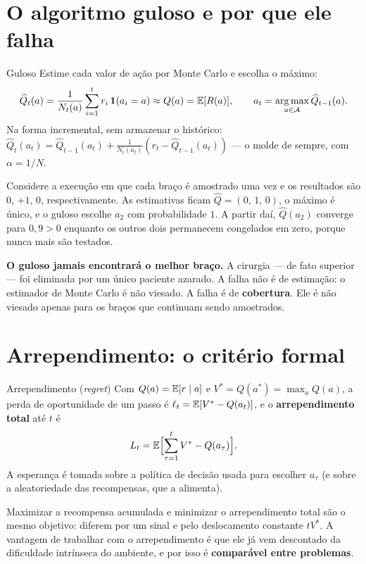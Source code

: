 \documentclass[11pt, a4paper]{article}
\newcommand{\Qhat}{\widehat{Q}}
\newcommand{\Nc}{N}
\newcommand{\one}{\mathbf{1}}
\newcommand{\Reg}{L}
\begin{document}
\section{O algoritmo guloso e por que ele falha}

\begin{algbox}{Guloso}
Estime cada valor de ação por Monte Carlo e escolha o máximo:
\[
  \Qhat_t(a) = \frac{1}{\Nc_t(a)} \sum_{i=1}^{t} r_i\,\one(a_i = a)
  \approx Q(a) = \E[R(a)],
  \qquad
  a_t = \argmax_{a \in \gA} \Qhat_{t-1}(a).
\]
Na forma incremental, sem armazenar o histórico:
$\Qhat_t(a_t) = \Qhat_{t-1}(a_t) + \frac{1}{\Nc_t(a_t)}(r_t - \Qhat_{t-1}(a_t))$
— o molde de sempre, com $\alpha = 1/\Nc$.
\end{algbox}

Considere a execução em que cada braço é amostrado uma vez e os resultados
são $0$, $+1$, $0$, respectivamente. As estimativas ficam
$\Qhat = (0,\,1,\,0)$, o máximo é único, e o guloso escolhe $a_2$ com
probabilidade $1$. A partir daí, $\Qhat(a_2)$ converge para $0{,}9 > 0$
enquanto os outros dois permanecem congelados em zero, porque nunca mais são
testados.

\begin{alertabox}
\textbf{O guloso jamais encontrará o melhor braço.} A cirurgia — de fato
superior — foi eliminada por um único paciente azarado. A falha não é de
estimação: o estimador de Monte Carlo é não viesado. A falha é de
\textbf{cobertura}. Ele é não viesado apenas para os braços que continuam
sendo amostrados.
\end{alertabox}

\section{Arrependimento: o critério formal}

\begin{defbox}{Arrependimento (\emph{regret})}
Com $Q(a) = \mathbb{E}[r \mid a]$ e $V^{*} = Q(a^{*}) = \max_{a} Q(a)$, a perda de
oportunidade de um passo é $\ell_t = \mathbb{E}[V^{*} - Q(a_t)]$, e o
\textbf{arrependimento total} até $t$ é
\[
  \Reg_t = \E\Bigl[\sum_{\tau=1}^{t} V^{*} - Q(a_\tau)\Bigr].
\]
A esperança é tomada sobre a política de decisão usada para escolher $a_\tau$
(e sobre a aleatoriedade das recompensas, que a alimenta).
\end{defbox}

Maximizar a recompensa acumulada e minimizar o arrependimento total são o
mesmo objetivo: diferem por um sinal e pelo deslocamento constante $tV^{*}$.
A vantagem de trabalhar com o arrependimento é que ele já vem descontado da
dificuldade intrínseca do ambiente, e por isso é \textbf{comparável entre
problemas}.
\end{document}
